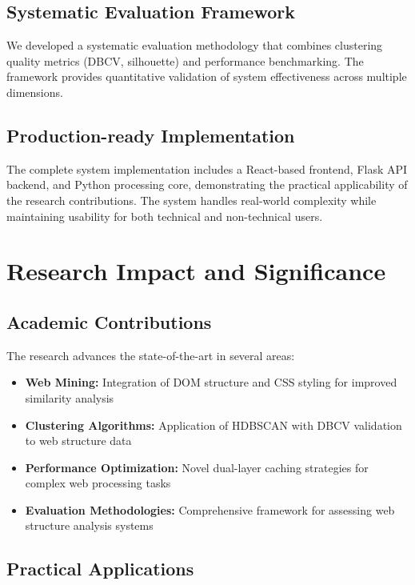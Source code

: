 \subsection{Systematic Evaluation Framework}

We developed a systematic evaluation methodology that combines clustering quality metrics (DBCV, silhouette) and performance benchmarking. The framework provides quantitative validation of system effectiveness across multiple dimensions.

\subsection{Production-ready Implementation}

The complete system implementation includes a React-based frontend, Flask API backend, and Python processing core, demonstrating the practical applicability of the research contributions. The system handles real-world complexity while maintaining usability for both technical and non-technical users.

\section{Research Impact and Significance}
\label{sec:research_impact}

\subsection{Academic Contributions}

The research advances the state-of-the-art in several areas:

\begin{itemize}
\item \textbf{Web Mining:} Integration of DOM structure and CSS styling for improved similarity analysis
\item \textbf{Clustering Algorithms:} Application of HDBSCAN with DBCV validation to web structure data
\item \textbf{Performance Optimization:} Novel dual-layer caching strategies for complex web processing tasks
\item \textbf{Evaluation Methodologies:} Comprehensive framework for assessing web structure analysis systems
\end{itemize}

\subsection{Practical Applications}

